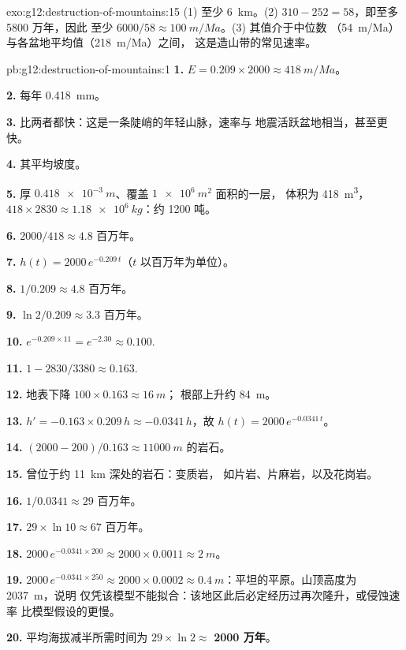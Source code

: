 \begin{solution}{exo:g12:destruction-of-mountains:15}
(1) 至少 \qty{6}{km}。(2) $310 - 252 = 58$，即至多 5800 万年，因此
至少 $6000/58 \approx \qty{100}{m/Ma}$。(3) 其值介于中位数
（\qty{54}{m/Ma}）与各盆地平均值（\qty{218}{m/Ma}）之间，
这是造山带的常见速率。
\end{solution}

\begin{solution}{pb:g12:destruction-of-mountains:1}
\textbf{1.} $E = 0.209 \times 2000 \approx \qty{418}{m/Ma}$。

\textbf{2.} 每年 \qty{0.418}{mm}。

\textbf{3.} 比两者都快：这是一条陡峭的年轻山脉，速率与
地震活跃盆地相当，甚至更快。

\textbf{4.} 其平均坡度。

\textbf{5.} 厚 $\qty{0.418e-3}{m}$、覆盖 $\qty{1e6}{m^2}$ 面积的一层，
体积为 \qty{418}{m^3}，$418 \times 2830 \approx \qty{1.18e6}{kg}$：约 1200
吨。

\textbf{6.} $2000/418 \approx 4.8$ 百万年。

\textbf{7.} $h(t) = 2000\,e^{-0.209\,t}$（$t$ 以百万年为单位）。

\textbf{8.} $1/0.209 \approx 4.8$ 百万年。

\textbf{9.} $\ln 2/0.209 \approx 3.3$ 百万年。

\textbf{10.} $e^{-0.209 \times 11} = e^{-2.30} \approx 0.100$.

\textbf{11.} $1 - 2830/3380 \approx 0.163$.

\textbf{12.} 地表下降 $100 \times 0.163 \approx \qty{16}{m}$；
根部上升约 \qty{84}{m}。

\textbf{13.} $h' = -0.163 \times 0.209\,h \approx -0.0341\,h$，故 $h(t) =
2000\,e^{-0.0341\,t}$。

\textbf{14.} $(2000 - 200)/0.163 \approx \qty{11000}{m}$ 的岩石。

\textbf{15.} 曾位于约 \qty{11}{km} 深处的岩石：变质岩，
如片岩、片麻岩，以及花岗岩。

\textbf{16.} $1/0.0341 \approx 29$ 百万年。

\textbf{17.} $29 \times \ln 10 \approx 67$ 百万年。

\textbf{18.} $2000\,e^{-0.0341 \times 200} \approx 2000 \times 0.0011 \approx
\qty{2}{m}$。

\textbf{19.} $2000\,e^{-0.0341 \times 250} \approx 2000 \times 0.0002 \approx
\qty{0.4}{m}$：平坦的平原。山顶高度为 \qty{2037}{m}，说明
仅凭该模型不能拟合：该地区此后必定经历过再次隆升，或侵蚀速率
比模型假设的更慢。

\textbf{20.} 平均海拔减半所需时间为 $29 \times \ln 2 \approx$
\textbf{2000 万年}。
\end{solution}
